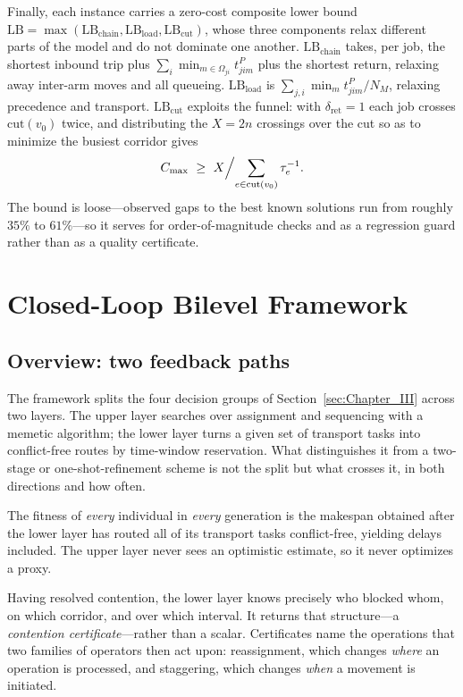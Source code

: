 \documentclass[manuscript,screen,review]{acmart}
\begin{document}
Finally, each instance carries a zero-cost composite lower bound
$\mathrm{LB}=\max(\mathrm{LB}_{\text{chain}},\mathrm{LB}_{\text{load}},
\mathrm{LB}_{\text{cut}})$, whose three components relax different parts of the
model and do not dominate one another. $\mathrm{LB}_{\text{chain}}$ takes, per
job, the shortest inbound trip plus $\sum_i \min_{m\in\Omega_{ji}}t^P_{jim}$
plus the shortest return, relaxing away inter-arm moves and all queueing.
$\mathrm{LB}_{\text{load}}$ is $\sum_{j,i}\min_m t^P_{jim}/N_M$, relaxing
precedence and transport. $\mathrm{LB}_{\text{cut}}$ exploits the funnel: with
$\delta_{\mathrm{ret}}=1$ each job crosses $\mathrm{cut}(v_0)$ twice, and
distributing the $X=2n$ crossings over the cut so as to minimize the busiest
corridor gives
\begin{equation}
\label{eq:lbcut}
C_{\max}\ \ge\ X\Bigl/\sum_{e\in \mathrm{cut}(v_0)}\tau_e^{-1}.
\end{equation}
The bound is loose---observed gaps to the best known solutions run from roughly
$35\%$ to $61\%$---so it serves for order-of-magnitude checks and as a
regression guard rather than as a quality certificate.

\section{Closed-Loop Bilevel Framework}
\label{sec:Chapter_IV}

\subsection{Overview: two feedback paths}
\label{sec:overview}

The framework splits the four decision groups of
Section~\ref{sec:Chapter_III} across two layers. The upper layer searches over
assignment and sequencing with a memetic algorithm; the lower layer turns a
given set of transport tasks into conflict-free routes by time-window
reservation. What distinguishes it from a two-stage or one-shot-refinement
scheme is not the split but what crosses it, in both directions and how often.

\begin{description}[leftmargin=0pt,topsep=3pt,itemsep=3pt]
\item[Evaluation path.] The fitness of \emph{every} individual in
\emph{every} generation is the makespan obtained after the lower layer has
routed all of its transport tasks conflict-free, yielding delays included. The
upper layer never sees an optimistic estimate, so it never optimizes a proxy.
\item[Decision path.] Having resolved contention, the lower layer knows
precisely who blocked whom, on which corridor, and over which interval. It
returns that structure---a \emph{contention certificate}---rather than a
scalar. Certificates name the operations that two families of operators then
act upon: reassignment, which changes \emph{where} an operation is processed,
and staggering, which changes \emph{when} a movement is initiated.
\end{description}
\end{document}
